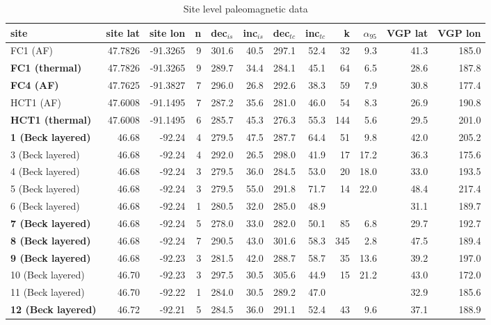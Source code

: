 \documentclass[11pt,letterpaper]{article}
\begin{document}
\begin{table}[h!]
\tiny
\caption{Site level paleomagnetic data}
\begin{tabular}{|l|r|r|r|r|r|r|r|r|r|r|r|}
\hline
site & site lat & site lon & n & dec$_{is}$ & inc$_{is}$ & dec$_{tc}$ & inc$_{tc}$ & k & $\alpha_{95}$ & VGP lat & VGP lon \\
\hline
	FC1 (AF)		&	47.7826	&	-91.3265	&	9	&	301.6	&	40.5	&	297.1	&	52.4	&	32	&	9.3	&	41.3	&	185.0	\\
\textbf{FC1 (thermal)	}	&	47.7826	&	-91.3265	&	9	&	289.7	&	34.4	&	284.1	&	45.1	&	64	&	6.5	&	28.6	&	187.8	\\
\textbf{FC4 (AF)	}	&	47.7625	&	-91.3827	&	7	&	296.0	&	26.8	&	292.6	&	38.3	&	59	&	7.9	&	30.8	&	177.4	\\
	HCT1 (AF)		&	47.6008	&	-91.1495	&	7	&	287.2	&	35.6	&	281.0	&	46.0	&	54	&	8.3	&	26.9	&	190.8	\\
\textbf{HCT1 (thermal)	}	&	47.6008	&	-91.1495	&	6	&	285.7	&	45.3	&	276.3	&	55.3	&	144	&	5.6	&	29.5	&	201.0	\\
\textbf{1 (Beck layered)	}	&	46.68	&	-92.24	&	4	&	279.5	&	47.5	&	287.7	&	64.4	&	51	&	9.8	&	42.0	&	205.2	\\
	3 (Beck layered)		&	46.68	&	-92.24	&	4	&	292.0	&	26.5	&	298.0	&	41.9	&	17	&	17.2	&	36.3	&	175.6	\\
	4 (Beck layered)		&	46.68	&	-92.24	&	3	&	279.5	&	36.0	&	284.5	&	53.0	&	20	&	18.0	&	33.0	&	193.5	\\
	5 (Beck layered)		&	46.68	&	-92.24	&	3	&	279.5	&	55.0	&	291.8	&	71.7	&	14	&	22.0	&	48.4	&	217.4	\\
	6 (Beck layered)		&	46.68	&	-92.24	&	1	&	280.5	&	32.0	&	285.0	&	48.9	&		&		&	31.1	&	189.7	\\
\textbf{7 (Beck layered)	}	&	46.68	&	-92.24	&	5	&	278.0	&	33.0	&	282.0	&	50.1	&	85	&	6.8	&	29.7	&	192.7	\\
\textbf{8 (Beck layered)	}	&	46.68	&	-92.24	&	7	&	290.5	&	43.0	&	301.6	&	58.3	&	345	&	2.8	&	47.5	&	189.4	\\
\textbf{9 (Beck layered)	}	&	46.68	&	-92.23	&	3	&	281.5	&	42.0	&	288.7	&	58.7	&	35	&	13.6	&	39.2	&	197.0	\\
	10 (Beck layered)		&	46.70	&	-92.23	&	3	&	297.5	&	30.5	&	305.6	&	44.9	&	15	&	21.2	&	43.0	&	172.0	\\
	11 (Beck layered)		&	46.70	&	-92.22	&	1	&	284.0	&	30.5	&	289.2	&	47.0	&		&		&	32.9	&	185.6	\\
\textbf{12 (Beck layered)	}	&	46.72	&	-92.21	&	5	&	284.5	&	36.0	&	291.1	&	52.4	&	43	&	9.6	&	37.1	&	188.9	\\

\end{tabular}
\end{table}
\end{document}
